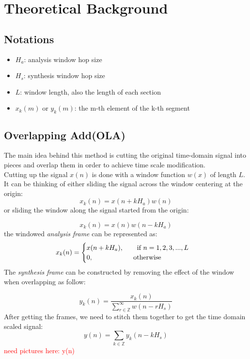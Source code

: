 \documentclass{article}
\begin{document}
\section{Theoretical Background}
\subsection{Notations}
\begin{itemize}
  \item $H_a$: analysis window hop size 
  \item $H_s$: synthesis window hop size
  \item $L$: window length, also the length of each section 
  \item $x_k(m)$ or $y_k(m)$: the m-th element of the k-th segment
\end{itemize}

\subsection{Overlapping Add(OLA)}
The main idea behind this method is  cutting the original time-domain signal into pieces and overlap them in order to achieve time scale modification.  \\
Cutting up the signal $x(n)$ is done with a window function $w(x)$ of length $L$. It can be thinking of either sliding the signal across the window centering at the origin: 
\begin{equation}
 x_{k}(n) =x(n+kH_a)w(n) 
\label{eq : }
\end{equation}
or sliding the window along the signal started from the origin: 

\begin{equation}
 x_{k}(n) =x(n)w(n-kH_a) 
\label{eq : }
\end{equation}
the windowed \textit{analysis frame} can be represented as: 
\begin{equation}
x_k(n) = \begin{cases}
        x(n +kH_a),  \text{\qquad if $n = 1,2,3,...,L$}\\
        0, \text{\qquad  \qquad \qquad otherwise} 
\end{cases}
\label{eq : }
\end{equation}
The \textit{synthesis frame} can be constructed by removing the effect of the window when overlapping as follow: 

\begin{equation}
        y_k(n) = \frac{x_{k}(n)}{\sum_{r\in \mathbb{Z}}^{\infty}w(n-rH_s) }
\label{eq : }
\end{equation}
After getting the frames, we need to stitch them together to get the time domain scaled signal: 
\begin{equation}
        y(n) =\sum_{k \in \mathbb{Z}} y_{k}(n - kH_s) \label{eq:}
\end{equation}
\textcolor{red}{need pictures here: y(n)}
\end{document}
